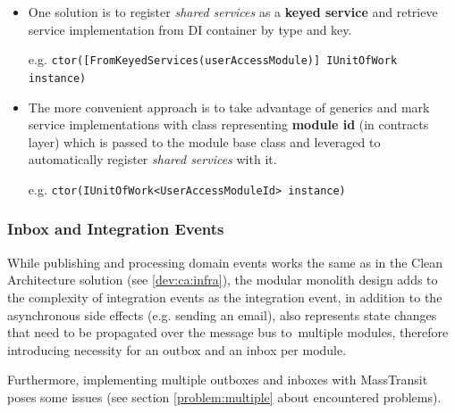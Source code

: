 \begin{itemize}
    \item One solution is to register \textit{shared services} as a \textbf{keyed service} and retrieve service implementation from DI container by type and key.
    
    e.g. \texttt{ctor([FromKeyedServices(\textquotedbl userAccessModule\textquotedbl)] IUnitOfWork instance)}
    
    \item The more convenient approach is to take advantage of generics and mark service implementations with class representing \textbf{module id} (in contracts layer) which is passed to the module base class and leveraged to automatically register \textit{shared services} with it.

    e.g. \texttt{ctor(IUnitOfWork<UserAccessModuleId> instance)}
\end{itemize}

\subsubsection{Inbox and Integration Events}
While publishing and processing domain events works the same as in the Clean Architecture solution (see \ref{dev:ca:infra}), the modular monolith design adds to the complexity of integration events as the integration event, in addition to the asynchronous side effects (e.g. sending an email), also represents state changes that need to be propagated over the message bus to~multiple modules, therefore introducing necessity for an outbox and an inbox per module. 

Furthermore, implementing multiple outboxes and inboxes with MassTransit poses some issues (see section \ref{problem:multiple} about encountered problems).

